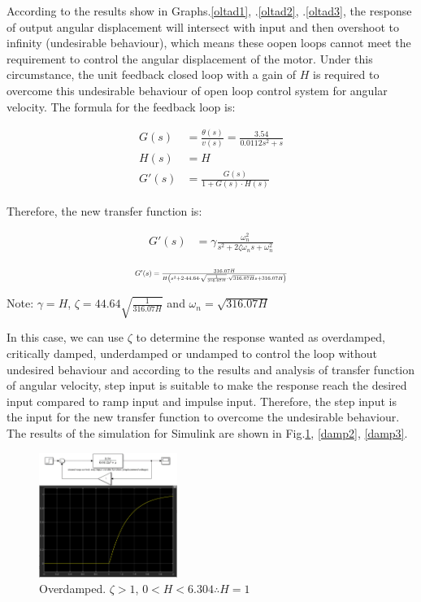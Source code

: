 \documentclass[conference]{IEEEtran}
\begin{document}
According to the results show in Graphs.\ref{oltad1}, .\ref{oltad2}, .\ref{oltad3}, the response of output angular displacement will intersect with input and then overshoot to infinity (undesirable behaviour), which means these oopen loops cannot meet the requirement to control the angular displacement of the motor. Under this circumstance, the unit feedback closed loop with a gain of $H$ is required to overcome this undesirable behaviour of open loop control system for angular velocity. The formula for the feedback loop is:

\begin{align}
    G(s) &= \frac{\theta (s)}{v(s)} = \frac{3.54}{0.0112s^2 + s}\\
    H(s) &= H\\
    G'(s) &= \frac{G(s)}{1 + G(s) \cdot H(s)}
\end{align}

Therefore, the new transfer function is:

\begin{align}
    G'(s) &= \gamma \frac{\omega_n^2}{s^2 + 2\zeta \omega_n s + \omega_n^2}
\end{align}

\begin{align}
    \resizebox{.4 \textwidth}{!}
    {$
    G'(s) = \frac{316.07H}{H\left( s^2 + 2 \cdot 44.64 \cdot \sqrt{\frac{1}{316.07H}} \cdot \sqrt{316.07 H} s + 316.07 H\right)}
    $}
\end{align}

Note: $\gamma = H$, $\zeta = 44.64 \sqrt{\frac{1}{316.07H}}$ and $\omega_n = \sqrt{316.07H}$

In this case, we can use $\zeta$ to determine the response wanted as overdamped, critically damped, underdamped or undamped to control the loop without undesired behaviour and according to the results and analysis of transfer function of angular velocity, step input is suitable to make the response reach the desired input compared to ramp input and impulse input. Therefore, the step input is the input for the new transfer function to overcome the undesirable behaviour. The results of the simulation for Simulink are shown in Fig.\ref{damp1}, \ref{damp2}, \ref{damp3}. 

\begin{figure}[htbp]
    \centerline{\includegraphics[width = 0.4\textwidth]{../img/q1-11.png}}
    \caption{Overdamped. $\zeta > 1$, $0 < H < 6.304 \therefore H = 1$}
    \label{damp1}
\end{figure}
\end{document}
